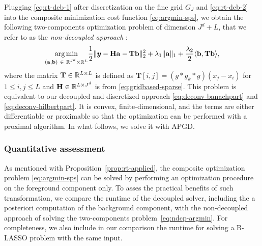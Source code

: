         Plugging \eqref{eq:rt-deb-1} after discretization on the fine grid $G_J$ and \eqref{eq:rt-deb-2} into the composite minimization cost function \eqref{eq:argmin-sps}, we obtain the following two-components optimization problem of dimension $J^d + L$, that we refer to as the \emph{non-decoupled approach} :
        \begin{equation}
        \label{eq:ndcp-argmin}
            \underset{(\mathbf{a}, \mathbf{b})\ \in\ \mathbb{R}^{J^d} \times \mathbb{R}^L}{\arg\min} \frac{1}{2} \| \bm{y} - \mathbf{Ha} - \mathbf{Tb} \|_2^2  + \lambda_{1} \| \mathbf{a} \|_1 + \frac{\lambda_{2}}{2} \langle \mathbf{b}, \mathbf{Tb} \rangle,
        \end{equation}
        where the matrix $\mathbf{T} \in \mathbb{R}^{L \times L}$ is defined as
        $\mathbf{T}[i, j] = (g * g_k * g)(x_j - x_i)$ for $1 \leq i, j \leq L$
        and $\mathbf{H} \in \mathbb{R}^{L\times J^d}$ is from \eqref{eq:gridbased-sparse}.
        This problem is equivalent to our decoupled and discretized approach \eqref{eq:deconv-banachpart} and \eqref{eq:deconv-hilbertpart}. It is convex, finite-dimensional, and the terms are either differentiable or proximable so that the optimization can be performed with a proximal algorithm. In what follows, we solve it with APGD. %
    
        \subsubsection{Quantitative assessment}
        As mentioned with Proposition~\ref{prop:rt-applied}, the composite optimization problem \eqref{eq:argmin-sps} can be solved by performing an optimization procedure on the foreground component only.
        To asses the practical benefits of such transformation, we compare the runtime of the decoupled solver, including the a posteriori computation of the background component, with the non-decoupled approach of solving the two-components problem~\eqref{eq:ndcp-argmin}. For completeness, we also include in our comparison the runtime for solving a B-LASSO problem with the same input.

